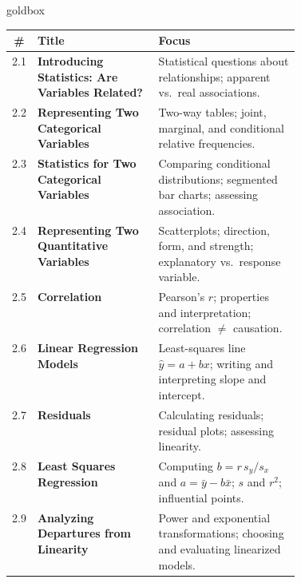 \documentclass[10pt]{article}
\begin{document}
\renewcommand{\arraystretch}{1.6}
\begin{skillbox}{goldbox}
\begin{tabularx}{\linewidth}{@{} c >{\bfseries}p{0.42\linewidth} X @{}}
  \textbf{\#} & \textbf{Title} & \textbf{Focus} \\
  \hline
  2.1 & Introducing Statistics: Are Variables Related?
    & Statistical questions about relationships; apparent vs.\ real associations. \\
  \hline
  2.2 & Representing Two Categorical Variables
    & Two-way tables; joint, marginal, and conditional relative frequencies. \\
  \hline
  2.3 & Statistics for Two Categorical Variables
    & Comparing conditional distributions; segmented bar charts; assessing association. \\
  \hline
  2.4 & Representing Two Quantitative Variables
    & Scatterplots; direction, form, and strength; explanatory vs.\ response variable. \\
  \hline
  2.5 & Correlation
    & Pearson's $r$; properties and interpretation; correlation $\ne$ causation. \\
  \hline
  2.6 & Linear Regression Models
    & Least-squares line $\hat{y}=a+bx$; writing and interpreting slope and intercept. \\
  \hline
  2.7 & Residuals
    & Calculating residuals; residual plots; assessing linearity. \\
  \hline
  2.8 & Least Squares Regression
    & Computing $b = r\,s_y/s_x$ and $a = \bar{y}-b\bar{x}$; $s$ and $r^2$; influential points. \\
  \hline
  2.9 & Analyzing Departures from Linearity
    & Power and exponential transformations; choosing and evaluating linearized models. \\
  \hline
\end{tabularx}
\end{skillbox}

\vspace{0.18in}
\end{document}
